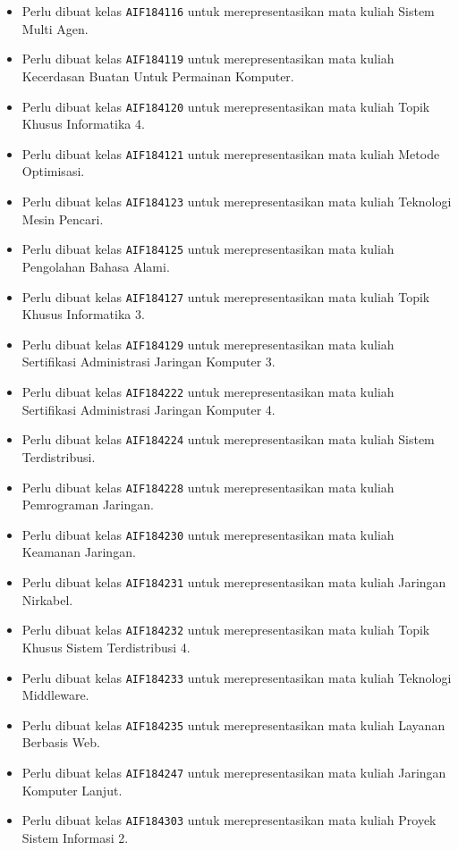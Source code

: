 \begin{enumerate}
\begin{itemize}
		\item Perlu dibuat kelas \texttt{AIF184116} untuk merepresentasikan mata kuliah Sistem Multi Agen.
		\item Perlu dibuat kelas \texttt{AIF184119} untuk merepresentasikan mata kuliah Kecerdasan Buatan Untuk Permainan Komputer.
		\item Perlu dibuat kelas \texttt{AIF184120} untuk merepresentasikan mata kuliah Topik Khusus Informatika 4.
		\item Perlu dibuat kelas \texttt{AIF184121} untuk merepresentasikan mata kuliah Metode Optimisasi.
		\item Perlu dibuat kelas \texttt{AIF184123} untuk merepresentasikan mata kuliah Teknologi Mesin Pencari.
		\item Perlu dibuat kelas \texttt{AIF184125} untuk merepresentasikan mata kuliah Pengolahan Bahasa Alami.
		\item Perlu dibuat kelas \texttt{AIF184127} untuk merepresentasikan mata kuliah Topik Khusus Informatika 3.
		\item Perlu dibuat kelas \texttt{AIF184129} untuk merepresentasikan mata kuliah Sertifikasi Administrasi Jaringan Komputer 3.
		\item Perlu dibuat kelas \texttt{AIF184222} untuk merepresentasikan mata kuliah Sertifikasi Administrasi Jaringan Komputer 4.
		\item Perlu dibuat kelas \texttt{AIF184224} untuk merepresentasikan mata kuliah Sistem Terdistribusi.
		\item Perlu dibuat kelas \texttt{AIF184228} untuk merepresentasikan mata kuliah Pemrograman Jaringan.
		\item Perlu dibuat kelas \texttt{AIF184230} untuk merepresentasikan mata kuliah Keamanan Jaringan.
		\item Perlu dibuat kelas \texttt{AIF184231} untuk merepresentasikan mata kuliah Jaringan Nirkabel.
		\item Perlu dibuat kelas \texttt{AIF184232} untuk merepresentasikan mata kuliah Topik Khusus Sistem Terdistribusi 4.
		\item Perlu dibuat kelas \texttt{AIF184233} untuk merepresentasikan mata kuliah Teknologi Middleware.
		\item Perlu dibuat kelas \texttt{AIF184235} untuk merepresentasikan mata kuliah Layanan Berbasis Web.
		\item Perlu dibuat kelas \texttt{AIF184247} untuk merepresentasikan mata kuliah Jaringan Komputer Lanjut.
		\item Perlu dibuat kelas \texttt{AIF184303} untuk merepresentasikan mata kuliah Proyek Sistem Informasi 2.

\end{itemize}
\end{enumerate}
